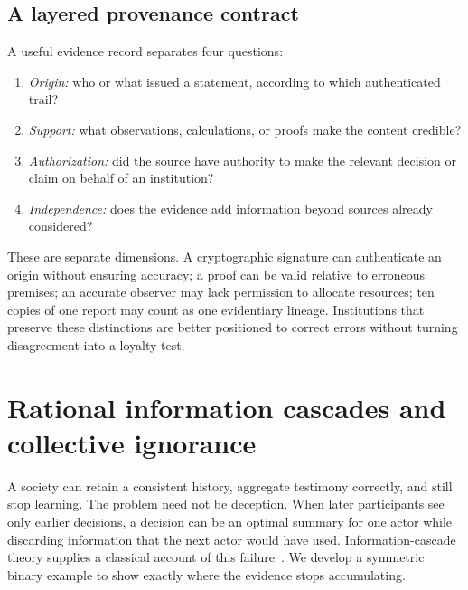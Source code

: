 \documentclass[11pt,letterpaper]{article}
\theoremstyle{plain}
\theoremstyle{definition}
\theoremstyle{remark}
\begin{document}
\subsection{A layered provenance contract}

A useful evidence record separates four questions:
\begin{enumerate}[label=(\roman*),leftmargin=2.1em]
\item \emph{Origin:} who or what issued a statement, according to which authenticated trail?
\item \emph{Support:} what observations, calculations, or proofs make the content credible?
\item \emph{Authorization:} did the source have authority to make the relevant decision or claim on behalf of an institution?
\item \emph{Independence:} does the evidence add information beyond sources already considered?
\end{enumerate}
These are separate dimensions. A cryptographic signature can authenticate an origin without ensuring accuracy; a proof can be valid relative to erroneous premises; an accurate observer may lack permission to allocate resources; ten copies of one report may count as one evidentiary lineage. Institutions that preserve these distinctions are better positioned to correct errors without turning disagreement into a loyalty test.


\section{Rational information cascades and collective ignorance}\label{sec:cascades}

A society can retain a consistent history, aggregate testimony correctly, and still stop learning. The problem need not be deception. When later participants see only earlier decisions, a decision can be an optimal summary for one actor while discarding information that the next actor would have used. Information-cascade theory supplies a classical account of this failure~\cite{bikhchandani1992}. We develop a symmetric binary example to show exactly where the evidence stops accumulating.
\end{document}

